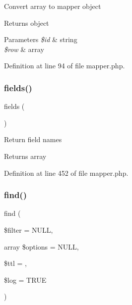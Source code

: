 Convert array to mapper object \begin{DoxyReturn}{Returns}
object 
\end{DoxyReturn}

\begin{DoxyParams}{Parameters}
{\em \$id} & string \\
\hline
{\em \$row} & array \\
\hline
\end{DoxyParams}


Definition at line 94 of file mapper.\+php.

\hypertarget{class_d_b_1_1_jig_1_1_mapper_a9dfc1601eaf8348bed6ba5622f725971}{}\label{class_d_b_1_1_jig_1_1_mapper_a9dfc1601eaf8348bed6ba5622f725971} 
\subsubsection{\texorpdfstring{fields()}{fields()}}
{\footnotesize\ttfamily fields (\begin{DoxyParamCaption}{ }\end{DoxyParamCaption})}

Return field names \begin{DoxyReturn}{Returns}
array 
\end{DoxyReturn}


Definition at line 452 of file mapper.\+php.

\hypertarget{class_d_b_1_1_jig_1_1_mapper_ad2b647dea97780ff7a831670ff6ba7dc}{}\label{class_d_b_1_1_jig_1_1_mapper_ad2b647dea97780ff7a831670ff6ba7dc} 
\subsubsection{\texorpdfstring{find()}{find()}}
{\footnotesize\ttfamily find (\begin{DoxyParamCaption}\item[{}]{\$filter = {\ttfamily NULL},  }\item[{array}]{\$options = {\ttfamily NULL},  }\item[{}]{\$ttl = {},  }\item[{}]{\$log = {\ttfamily TRUE} }\end{DoxyParamCaption})}

